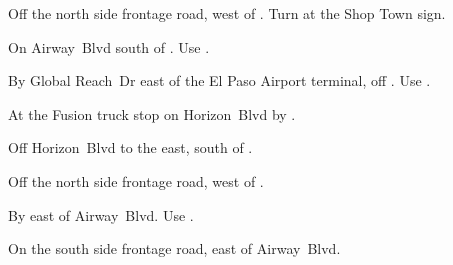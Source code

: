 
\begin{LocationList}

Off the north side  frontage road, west of .
Turn at the Shop Town sign.

On Airway~Blvd south of .
Use  .

By Global Reach~Dr east of the El Paso Airport terminal, off .
Use  .

At the Fusion truck stop on  Horizon~Blvd by .

\Location{\GarageHQ \Garage}
Off  Horizon~Blvd to the east, south of .

Off the north side  frontage road, west of .

By  east of Airway~Blvd.
Use  .

On the south side  frontage road, east of Airway~Blvd.

\end{LocationList}
